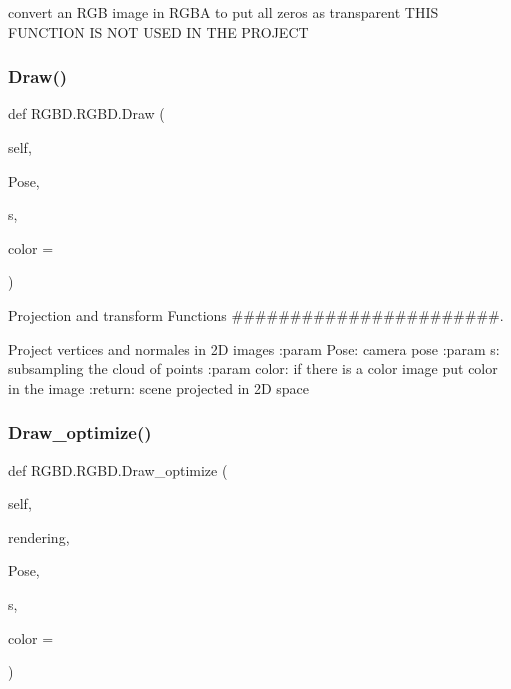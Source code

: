 \begin{DoxyVerb}convert an RGB image in RGBA to put all zeros as transparent
THIS FUNCTION IS NOT USED IN THE PROJECT
\end{DoxyVerb}
 \mbox{\label{class_r_g_b_d_1_1_r_g_b_d_ac3ebcc6ae06496726d76d73c5f83b735}} 
\subsubsection{\texorpdfstring{Draw()}{Draw()}}
{\footnotesize\ttfamily def R\+G\+B\+D.\+R\+G\+B\+D.\+Draw (\begin{DoxyParamCaption}\item[{}]{self,  }\item[{}]{Pose,  }\item[{}]{s,  }\item[{}]{color = {} }\end{DoxyParamCaption})}



Projection and transform Functions \#\#\#\#\#\#\#\#\#\#\#\#\#\#\#\#\#\#\#\#\#\#\#. 

\begin{DoxyVerb}Project vertices and normales in 2D images
:param Pose: camera pose
:param s: subsampling the cloud of points
:param color: if there is a color image put color in the image
:return: scene projected in 2D space
\end{DoxyVerb}
 \mbox{\label{class_r_g_b_d_1_1_r_g_b_d_a6fa82c4fbe506f20bf54911c385be73f}} 
\subsubsection{\texorpdfstring{Draw\+\_\+optimize()}{Draw\_optimize()}}
{\footnotesize\ttfamily def R\+G\+B\+D.\+R\+G\+B\+D.\+Draw\+\_\+optimize (\begin{DoxyParamCaption}\item[{}]{self,  }\item[{}]{rendering,  }\item[{}]{Pose,  }\item[{}]{s,  }\item[{}]{color = {} }\end{DoxyParamCaption})}

